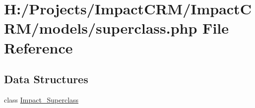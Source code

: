 \hypertarget{superclass_8php}{
\section{H:/Projects/ImpactCRM/ImpactCRM/models/superclass.php File Reference}
\label{superclass_8php}
}
\subsection*{Data Structures}
\begin{DoxyCompactItemize}
\item 
class \hyperlink{classImpact__Superclass}{Impact\_\-Superclass}
\end{DoxyCompactItemize}
